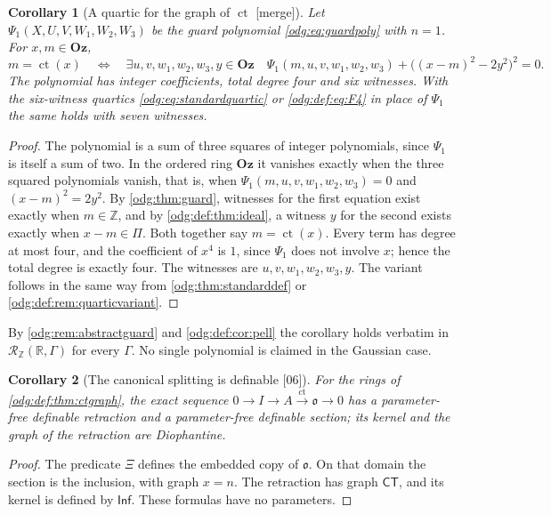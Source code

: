 \documentclass[11pt,oneside]{article}
\numberwithin{equation}{section}
\newtheorem{corollary}[corollary]{Corollary}
\theoremstyle{definition}
\theoremstyle{remark}
\newcommand{\Oz}{\mathbf{Oz}}
\newcommand{\Z}{\mathbb Z}
\newcommand{\R}{\mathbb R}
\newcommand{\ct}{\operatorname{ct}}
\newcommand{\src}[1]{\textup{\textsf{\small[#1]}}}
\newcommand{\mergetag}{\textup{\textsf{\small[merge]}}}
\begin{document}
\begin{corollary}[A quartic for the graph of $\ct$ \mergetag]\label{odg:def:cor:ctquartic}
Let $\Psi_1(X,U,V,W_1,W_2,W_3)$ be the guard polynomial
\eqref{odg:eq:guardpoly} with $n=1$. For $x,m\in\Oz$,
\[
 m=\ct(x)\quad\Longleftrightarrow\quad
 \exists u,v,w_1,w_2,w_3,y\in\Oz\quad
 \Psi_1(m,u,v,w_1,w_2,w_3)+\bigl((x-m)^2-2y^2\bigr)^2=0 .
\]
The polynomial has integer coefficients, total degree four and six
witnesses. With the six-witness quartics \eqref{odg:eq:standardquartic} or
\eqref{odg:def:eq:F4} in place of $\Psi_1$ the same holds with seven
witnesses.
\end{corollary}
\begin{proof}
The polynomial is a sum of three squares of integer polynomials, since
$\Psi_1$ is itself a sum of two. In the ordered ring $\Oz$ it vanishes exactly
when the three squared polynomials vanish, that is, when
$\Psi_1(m,u,v,w_1,w_2,w_3)=0$ and $(x-m)^2=2y^2$. By \cref{odg:thm:guard},
witnesses for the first equation exist exactly when $m\in\Z$, and by
\cref{odg:def:thm:ideal}, a witness $y$ for the second exists exactly when
$x-m\in\Pi$. Both together say $m=\ct(x)$. Every term has degree at most
four, and the coefficient of $x^4$ is $1$, since $\Psi_1$ does not involve
$x$; hence the total degree is exactly four. The witnesses are
$u,v,w_1,w_2,w_3,y$. The variant follows in
the same way from \cref{odg:thm:standarddef} or
\cref{odg:def:rem:quarticvariant}.
\end{proof}

By \cref{odg:rem:abstractguard} and \cref{odg:def:cor:pell} the corollary
holds verbatim in $\mathcal R_\Z(\R,\Gamma)$ for every $\Gamma$. No single
polynomial is claimed in the Gaussian case.

\begin{corollary}[The canonical splitting is definable \src{06}]\label{odg:def:cor:splitting}
For the rings of \cref{odg:def:thm:ctgraph}, the exact sequence
$0\to I\to A\xrightarrow{\ct}\mathfrak o\to0$ has a parameter-free definable
retraction and a parameter-free definable section; its kernel and the graph of
the retraction are Diophantine.
\end{corollary}
\begin{proof}
The predicate $\Xi$ defines the embedded copy of $\mathfrak o$.
On that domain the section is the inclusion, with graph $x=n$.
The retraction has graph $\mathsf{CT}$, and its kernel is defined by
$\mathsf{Inf}$. These formulas have no parameters.
\end{proof}
\end{document}
